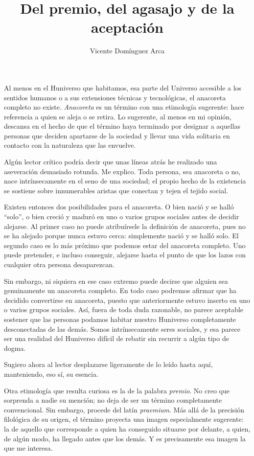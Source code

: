 \documentclass[12pt]{article}
\title{Del premio, del agasajo y de la aceptación}
\author{Vicente Domínguez Arca}
\date{}
\begin{document}
\maketitle

Al menos en el Huniverso que habitamos, esa parte del Universo accesible a los sentidos humanos o a sus extensiones técnicas y tecnológicas, el anacoreta completo no existe. \emph{Anacoreta} es un término con una etimología sugerente: hace referencia a quien se aleja o se retira. Lo sugerente, al menos en mi opinión, descansa en el hecho de que el término haya terminado por designar a aquellas personas que deciden apartarse de la sociedad y llevar una vida solitaria en contacto con la naturaleza que las envuelve.

Algún lector crítico podría decir que unas líneas atrás he realizado una aseveración demasiado rotunda. Me explico. Toda persona, sea anacoreta o no, nace intrínsecamente en el seno de una sociedad; el propio hecho de la existencia se sostiene sobre innumerables aristas que conectan y tejen el tejido social.

Existen entonces dos posibilidades para el anacoreta. O bien nació y se halló ``solo'', o bien creció y maduró en uno o varios grupos sociales antes de decidir alejarse. Al primer caso no puede atribuírsele la definición de anacoreta, pues no se ha alejado porque nunca estuvo cerca: simplemente nació y se halló solo. El segundo caso es lo más próximo que podemos estar del anacoreta completo. Uno puede pretender, e incluso conseguir, alejarse hasta el punto de que los lazos con cualquier otra persona desaparezcan.

Sin embargo, ni siquiera en ese caso extremo puede decirse que alguien sea genuinamente un anacoreta completo. En todo caso podremos afirmar que ha decidido convertirse en anacoreta, puesto que anteriormente estuvo inserto en uno o varios grupos sociales. Así, fuera de toda duda razonable, no parece aceptable sostener que las personas podamos habitar nuestro Huniverso completamente desconectadas de las demás. Somos intrínsecamente seres sociales, y esa parece ser una realidad del Huniverso difícil de rebatir sin recurrir a algún tipo de dogma.

Sugiero ahora al lector desplazarse ligeramente de lo leído hasta aquí, manteniendo, eso sí, su esencia.

Otra etimología que resulta curiosa es la de la palabra \emph{premio}. No creo que sorprenda a nadie su mención; no deja de ser un término completamente convencional. Sin embargo, procede del latín \emph{praemium}. Más allá de la precisión filológica de su origen, el término proyecta una imagen especialmente sugerente: la de aquello que corresponde a quien ha conseguido situarse por delante, a quien, de algún modo, ha llegado antes que los demás. Y es precisamente esa imagen la que me interesa.
\end{document}
